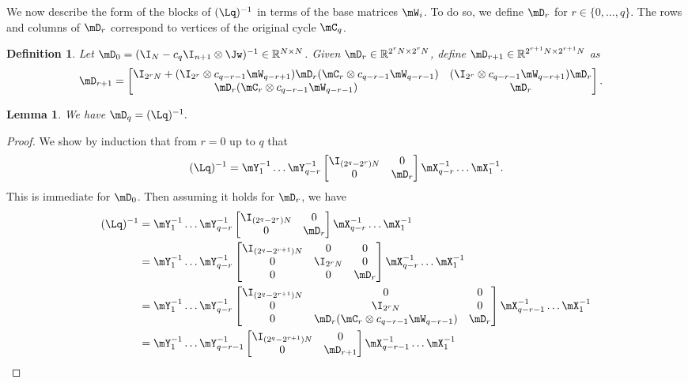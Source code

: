 \documentclass[11pt]{article}
\newtheorem{lemma}[theorem]{Lemma}
\newtheorem{definition}[theorem]{Definition}
\newcommand{\R}{{\mathbb R}}
\begin{document}
We now describe the form of the blocks of $(\Lq)^{-1}$ in terms of the base matrices $\mW_i$. To do so, we define $\mD_r$ for $r\in \{0,\ldots,q\}$. The rows and columns of $\mD_r$ correspond to vertices of the original cycle $\mC_{q}$. 
\begin{definition}\label{def:D}
Let $\mD_{0}=(\I_N-c_q\I_{n+1}\otimes \Jw)^{-1}\in \R^{N \times N}$. Given $\mD_{r} \in \R^{2^{r}N\times 2^{r}N}$, define $\mD_{r+1}\in\R^{2^{r+1}N\times 2^{r+1}N}$ as
\begin{align*}
    \mD_{r+1} &= \begin{bmatrix}\I_{2^{r}N}+(\I_{2^{r}}\otimes c_{q-r-1}\mW_{q-r+1})\mD_{r}(\mC_{r} \otimes c_{q-r-1}\mW_{q-r-1}) & (\I_{2^r}\otimes c_{q-r-1}\mW_{q-r+1})\mD_{r}\\ \mD_{r}(\mC_{r} \otimes c_{q-r-1}\mW_{q-r-1}) & \mD_{r}\end{bmatrix}.
\end{align*}

\end{definition}
%
\begin{lemma}\label{lem:Dzeroform}
We have $\mD_q=(\Lq)^{-1}.$
\end{lemma}
\begin{proof}
We show by induction that from $r=0$ up to $q$ that
\[(\Lq)^{-1}=\mY_1^{-1}\dots \mY_{q-r}^{-1}\begin{bmatrix}
 \I_{(2^q-2^{r})N} & 0\\ 0 & \mD_r\end{bmatrix}\mX_{q-r}^{-1}\dots\mX_1^{-1}.
\]
This is immediate for $\mD_0$. Then assuming it holds for $\mD_r$, 
we have %
\begin{align*}
    (\Lq)^{-1} &=\mY_1^{-1}\dots \mY_{q-r}^{-1}
    \begin{bmatrix}\I_{(2^q-2^{r})N} & 0\\ 0 & \mD_r\end{bmatrix}
    \mX_{q-r}^{-1}\dots\mX_1^{-1}\\
    &= \mY_1^{-1}\dots \mY_{q-r}^{-1}\begin{bmatrix}
 \I_{(2^q-2^{r+1})N} & 0 & 0\\ 0 & \I_{2^{r}N} & 0\\ 0 & 0 & \mD_r\end{bmatrix}\mX_{q-r}^{-1}\dots\mX_1^{-1}\\
 &= \mY_1^{-1}\dots \mY_{q-r}^{-1}\begin{bmatrix}
 \I_{(2^q-2^{r+1})N} & 0 & 0\\ 0 & \I_{2^{r}N} & 0\\ 0 & \mD_{r}(\mC_{r}\otimes c_{q-r-1}\mW_{q-r-1}) & \mD_r\end{bmatrix}\mX_{q-r-1}^{-1}\dots\mX_1^{-1}\\
 &= \mY_1^{-1}\dots \mY_{q-r-1}^{-1}\begin{bmatrix}
 \I_{(2^q-2^{r+1})N} & 0 \\ 0 & \mD_{r+1} \end{bmatrix}\mX_{q-r-1}^{-1}\dots\mX_1^{-1}\qedhere
\end{align*}
\end{proof}
\end{document}
